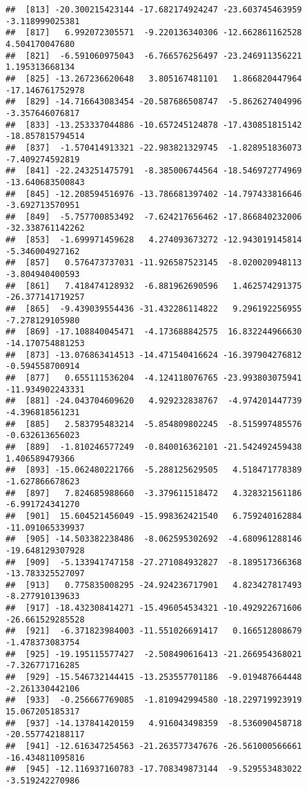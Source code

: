 \documentclass[
]{article}
\begin{document}
\begin{verbatim}
##  [813] -20.300215423144 -17.682174924247 -23.603745463959  -3.118999025381
##  [817]   6.992072305571  -9.220136340306 -12.662861162528   4.504170047680
##  [821]  -6.591060975043  -6.766576256497 -23.246911356221   1.195313668134
##  [825] -13.267236620648   3.805167481101   1.866820447964 -17.146761752978
##  [829] -14.716643083454 -20.587686508747  -5.862627404996  -3.357646076817
##  [833] -13.253337044886 -10.657245124878 -17.430851815142 -18.857815794514
##  [837]  -1.570414913321 -22.983821329745  -1.828951836073  -7.409274592819
##  [841] -22.243251475791  -8.385006744564 -18.546972774969 -13.640683500843
##  [845] -12.208594516976 -13.786681397402 -14.797433816646  -3.692713570951
##  [849]  -5.757700853492  -7.624217656462 -17.866840232006 -32.338761142262
##  [853]  -1.699971459628   4.274093673272 -12.943019145814  -5.346004927162
##  [857]   0.576473737031 -11.926587523145  -8.020020948113  -3.804940400593
##  [861]   7.418474128932  -6.881962690596   1.462574291375 -26.377141719257
##  [865]  -9.439039554436 -31.432286114822   9.296192256955  -7.278129105980
##  [869] -17.108840045471  -4.173688842575  16.832244966630 -14.170754881253
##  [873] -13.076863414513 -14.471540416624 -16.397904276812  -0.594558700914
##  [877]   0.655111536204  -4.124118076765 -23.993803075941 -11.934902243331
##  [881] -24.043704609620   4.929232838767  -4.974201447739  -4.396818561231
##  [885]   2.583795483214  -5.854809802245  -8.515997485576  -0.632613656023
##  [889]  -1.810246577249  -0.840016362101 -21.542492459438   1.406589479366
##  [893] -15.062480221766  -5.288125629505   4.518471778389  -1.627866678623
##  [897]   7.824685988660  -3.379611518472   4.328321561186  -6.991724341270
##  [901]  15.604521456049 -15.998362421540   6.759240162884 -11.091065339937
##  [905] -14.503382238486  -8.062595302692  -4.680961288146 -19.648129307928
##  [909]  -5.133941747158 -27.271084932827  -8.189517366368 -13.783325527097
##  [913]   0.775835008295 -24.924236717901   4.823427817493  -8.277910139633
##  [917] -18.432308414271 -15.496054534321 -10.492922671606 -26.661529285528
##  [921]  -6.371823984003 -11.551026691417   0.166512808679  -1.478373083754
##  [925] -19.195115577427  -2.508490616413 -21.266954368021  -7.326771716285
##  [929] -15.546732144415 -13.253557701186  -9.019487664448  -2.261330442106
##  [933]  -0.256667769085  -1.810942994580 -18.229719923919  15.067205185317
##  [937] -14.137841420159   4.916043498359  -8.536090458718 -20.557742188117
##  [941] -12.616347254563 -21.263577347676 -26.561000566661 -16.434811095816
##  [945] -12.116937160783 -17.708349873144  -9.529553483022  -3.519242270986

\end{verbatim}
\end{document}
